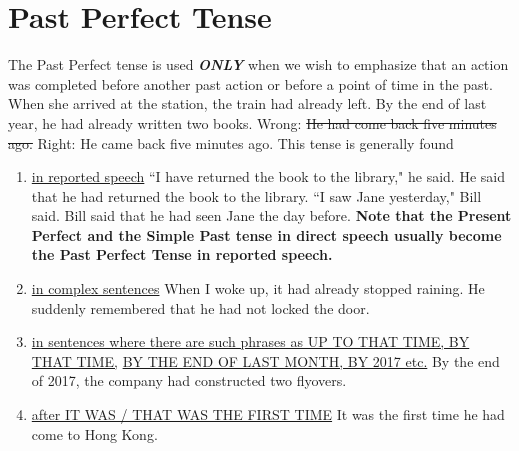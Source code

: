 \section{Past Perfect Tense}
The Past Perfect tense is used {\bf\it{ONLY}} when we wish to emphasize that an
action was completed before another past action or before a point of time in the
past.
\newline
\newline
When she arrived at the station, the train had already left.
\newline
By the end of last year, he had already written two books.
\newline
Wrong: \st{He had come back five minutes ago.}
\newline
Right: He came back five minutes ago.
\newline
\newline
This tense is generally found
\begin{enumerate}
    \item \underline{in reported speech}
        \newline
        \newline
        ``I have returned the book to the library," he said.
        \newline
        He said that he had returned the book to the library.
        \newline
        ``I saw Jane yesterday," Bill said.
        \newline
        Bill said that he had seen Jane the day before.
        \newline
        {\bf Note that the Present Perfect and the Simple Past tense in direct
        speech usually become the Past Perfect Tense in reported speech.}
    \item \underline{in complex sentences}
        \newline
        \newline
        When I woke up, it had already stopped raining.
        \newline
        He suddenly remembered that he had not locked the door.
    \item \underline{in sentences where there are such phrases as UP TO THAT
        TIME, BY THAT TIME,}
        \newline
        \underline{BY THE END OF LAST MONTH, BY 2017 etc.}
        \newline
        \newline
        By the end of 2017, the company had constructed two flyovers.
    \item \underline{after IT WAS / THAT WAS THE FIRST TIME}
        \newline
        \newline
        It was the first time he had come to Hong Kong.
\end{enumerate}

